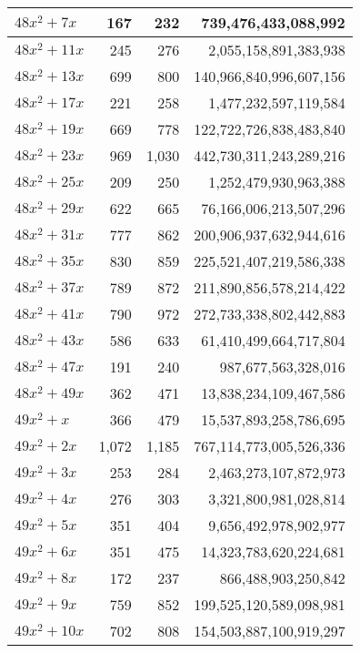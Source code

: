 \documentclass[a4paper]{amsproc}
\theoremstyle{plain}
\begin{document}
\begin{longtable}{ | l | r | r | r | }
$48x^2 + 7x$ & 167 & 232 & 739{,}476{,}433{,}088{,}992 \\ \hline
$48x^2 + 11x$ & 245 & 276 & 2{,}055{,}158{,}891{,}383{,}938 \\ \hline
$48x^2 + 13x$ & 699 & 800 & 140{,}966{,}840{,}996{,}607{,}156 \\ \hline
$48x^2 + 17x$ & 221 & 258 & 1{,}477{,}232{,}597{,}119{,}584 \\ \hline
$48x^2 + 19x$ & 669 & 778 & 122{,}722{,}726{,}838{,}483{,}840 \\ \hline
$48x^2 + 23x$ & 969 & 1{,}030 & 442{,}730{,}311{,}243{,}289{,}216 \\ \hline
$48x^2 + 25x$ & 209 & 250 & 1{,}252{,}479{,}930{,}963{,}388 \\ \hline
$48x^2 + 29x$ & 622 & 665 & 76{,}166{,}006{,}213{,}507{,}296 \\ \hline
$48x^2 + 31x$ & 777 & 862 & 200{,}906{,}937{,}632{,}944{,}616 \\ \hline
$48x^2 + 35x$ & 830 & 859 & 225{,}521{,}407{,}219{,}586{,}338 \\ \hline
$48x^2 + 37x$ & 789 & 872 & 211{,}890{,}856{,}578{,}214{,}422 \\ \hline
$48x^2 + 41x$ & 790 & 972 & 272{,}733{,}338{,}802{,}442{,}883 \\ \hline
$48x^2 + 43x$ & 586 & 633 & 61{,}410{,}499{,}664{,}717{,}804 \\ \hline
$48x^2 + 47x$ & 191 & 240 & 987{,}677{,}563{,}328{,}016 \\ \hline
$48x^2 + 49x$ & 362 & 471 & 13{,}838{,}234{,}109{,}467{,}586 \\ \hline
$49x^2 + x$ & 366 & 479 & 15{,}537{,}893{,}258{,}786{,}695 \\ \hline
$49x^2 + 2x$ & 1{,}072 & 1{,}185 & 767{,}114{,}773{,}005{,}526{,}336 \\ \hline
$49x^2 + 3x$ & 253 & 284 & 2{,}463{,}273{,}107{,}872{,}973 \\ \hline
$49x^2 + 4x$ & 276 & 303 & 3{,}321{,}800{,}981{,}028{,}814 \\ \hline
$49x^2 + 5x$ & 351 & 404 & 9{,}656{,}492{,}978{,}902{,}977 \\ \hline
$49x^2 + 6x$ & 351 & 475 & 14{,}323{,}783{,}620{,}224{,}681 \\ \hline
$49x^2 + 8x$ & 172 & 237 & 866{,}488{,}903{,}250{,}842 \\ \hline
$49x^2 + 9x$ & 759 & 852 & 199{,}525{,}120{,}589{,}098{,}981 \\ \hline
$49x^2 + 10x$ & 702 & 808 & 154{,}503{,}887{,}100{,}919{,}297 \\ \hline

\end{longtable}
\end{document}
